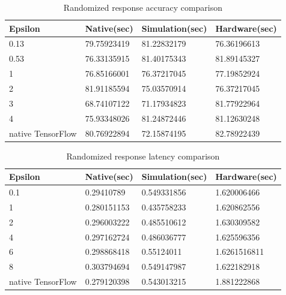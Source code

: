 \begin{table}[h!]
  \begin{center}
    \caption{Randomized response accuracy comparison}
    \label{tab:table}
    \begin{tabular}{l|l|l|l}
      \textbf{Epsilon} & \textbf{Native(sec)} & \textbf{Simulation(sec)} & \textbf{Hardware(sec)}\\
      \hline
     
0.13 &        79.75923419 &        81.22832179 &        76.36196613\\
0.53 &        76.33135915 &        81.40175343 &        81.89145327\\
1 &        76.85166001 &        76.37217045 &        77.19852924\\
2 &        81.91185594 &        75.03570914 &        76.37217045\\
3 &        68.74107122 &        71.17934823 &        81.77922964\\
4 &        75.93348026 &        81.24872446 &        81.12630248\\
native TensorFlow &        80.76922894 &        72.15874195 &        82.78922439\\
    \end{tabular}
   \end{center}
\end{table}
\begin{table}[h!]
  \begin{center}
    \caption{Randomized response latency comparison}
    \label{tab:table}
    \begin{tabular}{l|l|l|l}
      \textbf{Epsilon} & \textbf{Native(sec)} & \textbf{Simulation(sec)} & \textbf{Hardware(sec)}\\
      \hline
0.1 &        0.29410789 &        0.549331856 &        1.620006466\\
1 &        0.280151153 &        0.435758233 &        1.620862556\\
2 &        0.296003222 &        0.485510612 &        1.630309582\\
4 &        0.297162724 &        0.486036777 &        1.625596356\\
6 &        0.298868418 &        0.55124011 &        1.6261516811\\
8 &        0.303794694 &        0.549147987 &        1.622182918\\
native TensorFlow &        0.279120398 &        0.543013215 &        1.881222868\\
    \end{tabular}
   \end{center}
\end{table}


